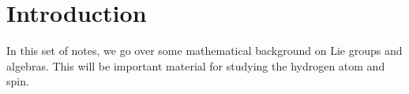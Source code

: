 \section{Introduction}
In this set of notes, we go over some mathematical background on Lie groups and algebras. This will be important material for studying the hydrogen atom and spin.
